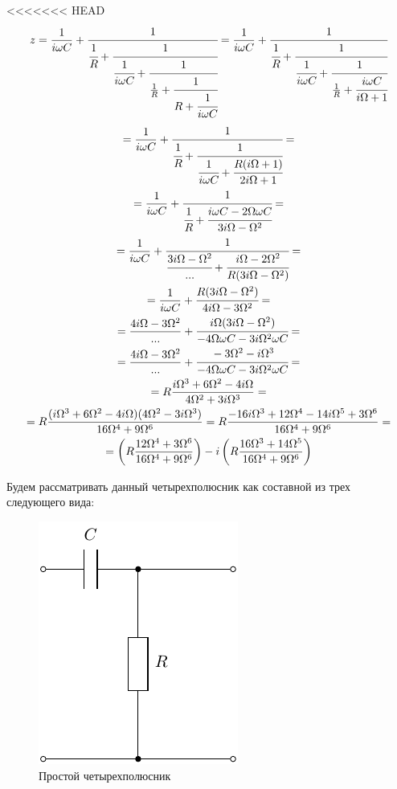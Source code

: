 <<<<<<< HEAD
\begin{equation}
	z=\frac{1}{i\omega C}+
	\cfrac{1}{
		\cfrac{1}{R}+
		\cfrac{1}{
			\cfrac{1}{i\omega C}+
			\cfrac{1}{
				\frac{1}{R}+
					\cfrac{1}{
						R+
						\cfrac{1}{
							i\omega C				
						}
					}
				}
			}		
			}=
\frac{1}{i\omega C}+
	\cfrac{1}{
		\cfrac{1}{R}+
		\cfrac{1}{
			\cfrac{1}{i\omega C}+
			\cfrac{1}{
				\frac{1}{R}+
					\cfrac{i\omega C}{i\Omega+1}
				}
			}		
			}
\end{equation}
\begin{gather}
=
\frac{1}{i\omega C}+
	\cfrac{1}{
		\cfrac{1}{R}+
		\cfrac{1}{
			\cfrac{1}{i\omega C}+
			\cfrac{R(i\Omega+1)}{2i\Omega+1}	
		}	
	}
=\\=
\frac{1}{i\omega C}+
	\cfrac{1}{
		\cfrac{1}{R}+		
			\cfrac{i\omega C - 2\Omega \omega C}{3i\Omega-\Omega^2}
	}
=\\=
\frac{1}{i\omega C}+
	\cfrac{1}{
		\cfrac{3i\Omega-\Omega^2}{...}+		
			\cfrac{i\Omega - 2\Omega^2}{R(3i\Omega-\Omega^2)}
	}
=\\=
\frac{1}{i\omega C}+
\cfrac{R(3i\Omega-\Omega^2)}{4i\Omega - 3\Omega^2}
=\\=
\frac{4i\Omega - 3\Omega^2}{...}+
\cfrac{i\Omega(3i\Omega-\Omega^2)}{-4\Omega\omega C - 3i\Omega^2\omega C}
=\\=
\frac{4i\Omega - 3\Omega^2}{...}+
\cfrac{-3\Omega^2-i\Omega^3}{-4\Omega\omega C - 3i\Omega^2\omega C}
=\\=
R\frac{
	i\Omega^3
	+6\Omega^2
	-4i\Omega 
}{
	4\Omega^2 
	+3i\Omega^3
}
=\\=
R\frac{
	(i\Omega^3
	+6\Omega^2
	-4i\Omega )
	(
		4\Omega^2 
		-3i\Omega^3	
	)
}{
	16\Omega^4
	+9\Omega^6
}
=R\frac{
	-16 i \Omega^3 + 12 \Omega^4 - 14 i \Omega^5 + 3 \Omega^6
}{
	16\Omega^4
	+9\Omega^6
}
=\\=
\left(
R
	\frac{
		12 \Omega^4 + 3 \Omega^6
	}{
		16\Omega^4
		+9\Omega^6
	}
\right)
-i
\left(
	R\frac{
		16 \Omega^3 + 14 \Omega^5
	}{
		16\Omega^4
		+9\Omega^6
	}
\right)
\end{gather}

Будем рассматривать данный четырехполюсник как составной из трех следующего вида:
\begin{figure}[H]
	\centering
	\includegraphics[]{chems/chem6_one}
	\caption{Простой четырехполюсник}
	\label{fig:ph_rot2_one}
\end{figure}

